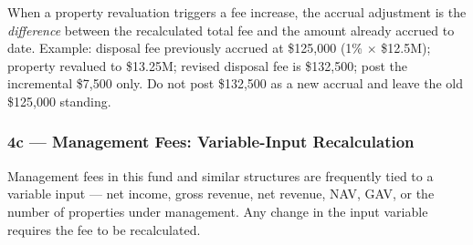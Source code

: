 \documentclass[10pt,a4paper]{article}
\begin{document}
\begin{warning}
When a property revaluation triggers a fee increase, the accrual adjustment is the \emph{difference} between the recalculated total fee and the amount already accrued to date. Example: disposal fee previously accrued at \$125,000 (1\% $\times$ \$12.5M); property revalued to \$13.25M; revised disposal fee is \$132,500; post the incremental \$7,500 only. Do not post \$132,500 as a new accrual and leave the old \$125,000 standing.
\end{warning}


\subsubsection{4c --- Management Fees: Variable-Input Recalculation}
\label{sec:grp4c}

Management fees in this fund and similar structures are frequently tied to a variable input --- net income, gross revenue, net revenue, NAV, GAV, or the number of properties under management. Any change in the input variable requires the fee to be recalculated.
\end{document}
